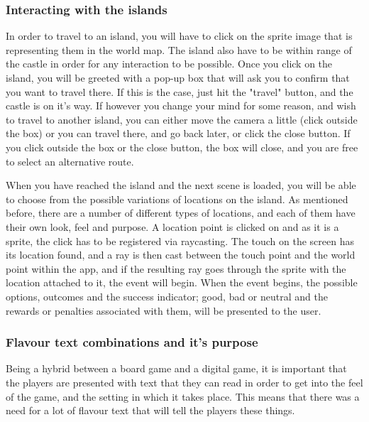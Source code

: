 \subsubsection{Interacting with the islands}
In order to travel to an island, you will have to click on the sprite image that is representing them in the world map. The island also have to be within range of the castle in order for any interaction to be possible. 
Once you click on the island, you will be greeted with a pop-up box that will ask you to confirm that you want to travel there. If this is the case, just hit the "travel" button, and the castle is on it's way. If however you change your mind for some reason, and wish to travel to another island, you can either move the camera a little (click outside the box) or you can travel there, and go back later, or click the close button. If you click outside the box or the close button, the box will close, and you are free to select an alternative route.

When you have reached the island and the next scene is loaded, you will be able to choose from the possible variations of locations on the island. As mentioned before, there are a number of different types of locations, and each of them have their own look, feel and purpose.
A location point is clicked on and as it is a sprite, the click has to be registered via raycasting. The touch on the screen has its location found, and a ray is then cast between the touch point and the world point within the app, and if the resulting ray goes through the sprite with the location attached to it, the event will begin. When the event begins, the possible options, outcomes and the success indicator; good, bad or neutral and the rewards or penalties associated with them, will be presented to the user.

\subsubsection{Flavour text combinations and it's purpose}
Being a hybrid between a board game and a digital game, it is important that the players are presented with text that they can read in order to get into the feel of the game, and the setting in which it takes place. This means that there was a need for a lot of flavour text that will tell the players these things. 

